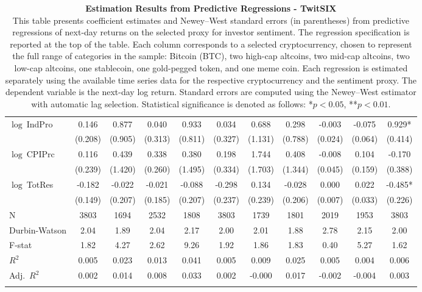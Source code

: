 \begin{table}[ht]
\begin{tabular}{l *{10}{c}}
\addlinespace
$\log\ $IndPro & 0.146 & 0.877 & 0.040 & 0.933 & 0.034 & 0.688 & 0.298 & -0.003 & -0.075 & 0.929* \\
 & (0.208) & (0.905) & (0.313) & (0.811) & (0.327) & (1.131) & (0.788) & (0.024) & (0.064) & (0.414) \\
\addlinespace
$\log\ $CPIPrc & 0.116 & 0.439 & 0.338 & 0.380 & 0.198 & 1.744 & 0.408 & -0.008 & 0.104 & -0.170 \\
 & (0.239) & (1.420) & (0.260) & (1.495) & (0.334) & (1.703) & (1.344) & (0.045) & (0.159) & (0.388) \\
\addlinespace
$\log\ $TotRes & -0.182 & -0.022 & -0.021 & -0.088 & -0.298 & 0.134 & -0.028 & 0.000 & 0.022 & -0.485* \\
 & (0.149) & (0.207) & (0.185) & (0.207) & (0.237) & (0.239) & (0.206) & (0.007) & (0.033) & (0.226) \\
\addlinespace
\midrule
N & 3803 & 1694 & 2532 & 1808 & 3803 & 1739 & 1801 & 2019 & 1953 & 3803 \\
Durbin-Watson & 2.04 & 1.89 & 2.04 & 2.17 & 2.00 & 2.01 & 1.88 & 2.78 & 2.15 & 2.00 \\
F-stat & 1.82 & 4.27 & 2.62 & 9.26 & 1.92 & 1.86 & 1.83 & 0.40 & 5.27 & 1.62 \\
\(R^2\) & 0.005 & 0.023 & 0.013 & 0.041 & 0.005 & 0.009 & 0.025 & 0.005 & 0.004 & 0.006 \\
Adj.\ \(R^2\) & 0.002 & 0.014 & 0.008 & 0.033 & 0.002 & -0.000 & 0.017 & -0.002 & -0.004 & 0.003 \\
\addlinespace
\midrule
\multicolumn{11}{c}{Specification tested: $R_{i,t+1} = \alpha_i + \beta_{sent} S_t + \phi R_{i,t} + \theta B_{i,t} + \gamma M_t + \varepsilon_{i,t+1}$}\\
\bottomrule
\end{tabular}
\caption{\textbf{Estimation Results from Predictive Regressions - TwitSIX} \\
This table presents coefficient estimates and Newey--West standard errors (in parentheses) from predictive regressions of next-day returns on the selected proxy for investor sentiment. The regression specification is reported at the top of the table. Each column corresponds to a selected cryptocurrency, chosen to represent the full range of categories in the sample: Bitcoin (BTC), two high-cap altcoins, two mid-cap altcoins, two low-cap altcoins, one stablecoin, one gold-pegged token, and one meme coin. Each regression is estimated separately using the available time series data for the respective cryptocurrency and the sentiment proxy. The dependent variable is the next-day log return. Standard errors are computed using the Newey--West estimator with automatic lag selection. Statistical significance is denoted as follows: *$p<0.05$, **$p<0.01$.}
\label{tab:twitsix_result_h1}
\end{table}
